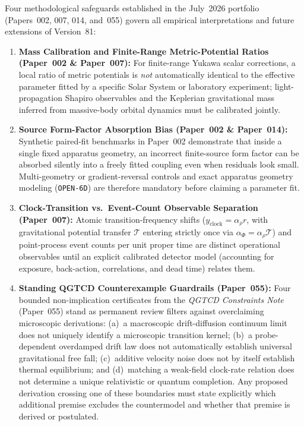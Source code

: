Four methodological safeguards established in the July~2026 portfolio (Papers~002, 007, 014, and~055) govern all empirical interpretations and future extensions of Version~81:
\begin{enumerate}[leftmargin=2em]
  \item \textbf{Mass Calibration and Finite-Range Metric-Potential Ratios (Paper~002 \& Paper~007):} For finite-range Yukawa scalar corrections, a local ratio of metric potentials is \emph{not} automatically identical to the effective parameter fitted by a specific Solar System or laboratory experiment; light-propagation Shapiro observables and the Keplerian gravitational mass inferred from massive-body orbital dynamics must be calibrated jointly.
  \item \textbf{Source Form-Factor Absorption Bias (Paper~002 \& Paper~014):} Synthetic paired-fit benchmarks in Paper~002 demonstrate that inside a single fixed apparatus geometry, an incorrect finite-source form factor can be absorbed silently into a freely fitted coupling even when residuals look small. Multi-geometry or gradient-reversal controls and exact apparatus geometry modeling (\texttt{OPEN-6D}) are therefore mandatory before claiming a parameter fit.
  \item \textbf{Clock-Transition vs.\ Event-Count Observable Separation (Paper~007):} Atomic transition-frequency shifts ($y_{\mathrm{clock}} = \alpha_\rho r$, with gravitational potential transfer $\mathcal{T}$ entering strictly once via $\alpha_\Phi = \alpha_\rho\mathcal{T}$) and point-process event counts per unit proper time are distinct operational observables until an explicit calibrated detector model (accounting for exposure, back-action, correlations, and dead time) relates them.
  \item \textbf{Standing QGTCD Counterexample Guardrails (Paper~055):} Four bounded non-implication certificates from the \emph{QGTCD Constraints Note} (Paper~055) stand as permanent review filters against overclaiming microscopic derivations: (a)~a macroscopic drift-diffusion continuum limit does not uniquely identify a microscopic transition kernel; (b)~a probe-dependent overdamped drift law does not automatically establish universal gravitational free fall; (c)~additive velocity noise does not by itself establish thermal equilibrium; and (d)~matching a weak-field clock-rate relation does not determine a unique relativistic or quantum completion. Any proposed derivation crossing one of these boundaries must state explicitly which additional premise excludes the countermodel and whether that premise is derived or postulated.
\end{enumerate}

